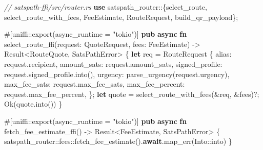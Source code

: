 \documentclass[
]{article}
\newenvironment{Shaded}{}{}
\newcommand{\AttributeTok}[1]{\textcolor[rgb]{0.49,0.56,0.16}{#1}}
\newcommand{\BuiltInTok}[1]{\textcolor[rgb]{0.00,0.50,0.00}{#1}}
\newcommand{\CommentTok}[1]{\textcolor[rgb]{0.38,0.63,0.69}{\textit{#1}}}
\newcommand{\ConstantTok}[1]{\textcolor[rgb]{0.53,0.00,0.00}{#1}}
\newcommand{\DataTypeTok}[1]{\textcolor[rgb]{0.56,0.13,0.00}{#1}}
\newcommand{\KeywordTok}[1]{\textcolor[rgb]{0.00,0.44,0.13}{\textbf{#1}}}
\newcommand{\NormalTok}[1]{#1}
\newcommand{\OperatorTok}[1]{\textcolor[rgb]{0.40,0.40,0.40}{#1}}
\newcommand{\PreprocessorTok}[1]{\textcolor[rgb]{0.74,0.48,0.00}{#1}}
\newcommand{\StringTok}[1]{\textcolor[rgb]{0.25,0.44,0.63}{#1}}
\begin{document}
\begin{Shaded}
\begin{Highlighting}[]
\CommentTok{// satspath{-}ffi/src/router.rs}
\KeywordTok{use} \PreprocessorTok{satspath\_router::}\OperatorTok{\{}\NormalTok{select\_route}\OperatorTok{,}\NormalTok{ select\_route\_with\_fees}\OperatorTok{,}\NormalTok{ FeeEstimate}\OperatorTok{,}\NormalTok{ RouteRequest}\OperatorTok{,}\NormalTok{ build\_qr\_payload}\OperatorTok{\};}

\AttributeTok{\#[}\PreprocessorTok{uniffi::}\NormalTok{export}\AttributeTok{(}\NormalTok{async\_runtime }\OperatorTok{=} \StringTok{"tokio"}\AttributeTok{)]}
\KeywordTok{pub} \KeywordTok{async} \KeywordTok{fn}\NormalTok{ select\_route\_ffi(request}\OperatorTok{:}\NormalTok{ QuoteRequest}\OperatorTok{,}\NormalTok{ fees}\OperatorTok{:}\NormalTok{ FeeEstimate) }\OperatorTok{{-}\textgreater{}} \DataTypeTok{Result}\OperatorTok{\textless{}}\NormalTok{RouteQuote}\OperatorTok{,}\NormalTok{ SatsPathError}\OperatorTok{\textgreater{}} \OperatorTok{\{}
    \KeywordTok{let}\NormalTok{ req }\OperatorTok{=}\NormalTok{ RouteRequest }\OperatorTok{\{}
\NormalTok{        alias}\OperatorTok{:}\NormalTok{ request}\OperatorTok{.}\NormalTok{recipient}\OperatorTok{,}
\NormalTok{        amount\_sats}\OperatorTok{:}\NormalTok{ request}\OperatorTok{.}\NormalTok{amount\_sats}\OperatorTok{,}
\NormalTok{        signed\_profile}\OperatorTok{:}\NormalTok{ request}\OperatorTok{.}\NormalTok{signed\_profile}\OperatorTok{.}\NormalTok{into()}\OperatorTok{,}
\NormalTok{        urgency}\OperatorTok{:}\NormalTok{ parse\_urgency(request}\OperatorTok{.}\NormalTok{urgency)}\OperatorTok{,}
\NormalTok{        max\_fee\_sats}\OperatorTok{:}\NormalTok{ request}\OperatorTok{.}\NormalTok{max\_fee\_sats}\OperatorTok{,}
\NormalTok{        max\_fee\_percent}\OperatorTok{:}\NormalTok{ request}\OperatorTok{.}\NormalTok{max\_fee\_percent}\OperatorTok{,}
    \OperatorTok{\};}
    \KeywordTok{let}\NormalTok{ quote }\OperatorTok{=}\NormalTok{ select\_route\_with\_fees(}\OperatorTok{\&}\NormalTok{req}\OperatorTok{,} \OperatorTok{\&}\NormalTok{fees)}\OperatorTok{?;}
    \ConstantTok{Ok}\NormalTok{(quote}\OperatorTok{.}\NormalTok{into())}
\OperatorTok{\}}

\AttributeTok{\#[}\PreprocessorTok{uniffi::}\NormalTok{export}\AttributeTok{(}\NormalTok{async\_runtime }\OperatorTok{=} \StringTok{"tokio"}\AttributeTok{)]}
\KeywordTok{pub} \KeywordTok{async} \KeywordTok{fn}\NormalTok{ fetch\_fee\_estimate\_ffi() }\OperatorTok{{-}\textgreater{}} \DataTypeTok{Result}\OperatorTok{\textless{}}\NormalTok{FeeEstimate}\OperatorTok{,}\NormalTok{ SatsPathError}\OperatorTok{\textgreater{}} \OperatorTok{\{}
    \PreprocessorTok{satspath\_router::fees::}\NormalTok{fetch\_fee\_estimate()}\OperatorTok{.}\KeywordTok{await}\OperatorTok{.}\NormalTok{map\_err(}\BuiltInTok{Into}\PreprocessorTok{::}\NormalTok{into)}
\OperatorTok{\}}


\end{Highlighting}
\end{Shaded}
\end{document}
